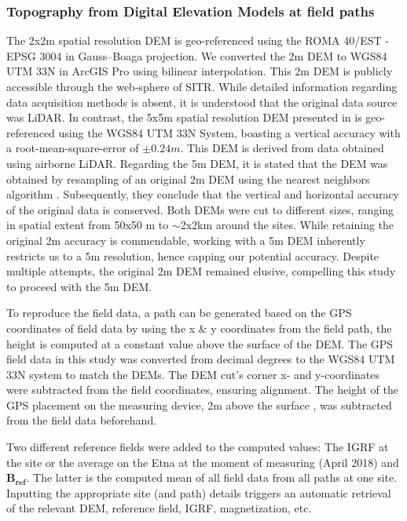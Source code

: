 \subsubsection{Topography from Digital Elevation Models at field paths}
The 2x2m spatial resolution DEM \cite{ATA} is geo-referenced using the ROMA 40/EST - EPSG 3004 in Gauss–Boaga projection. We converted the 2m DEM to WGS84 UTM 33N in ArcGIS Pro using bilinear interpolation. This 2m DEM is publicly accessible through the web-sphere of SITR. While detailed information regarding data acquisition methods is absent, it is understood that the original data source was LiDAR. In contrast, the 5x5m spatial resolution DEM presented in \cite{Bisson16} is geo-referenced using the WGS84 UTM 33N System, boasting a vertical accuracy with a root-mean-square-error of $\pm 0.24 m$. This DEM is derived from data obtained using airborne LiDAR. Regarding the 5m DEM, it is stated that the DEM was obtained by resampling of an original 2m DEM using the nearest neighbors algorithm \parencite{Bisson16}. Subsequently, they conclude that the vertical and horizontal accuracy of the original data is conserved. Both DEMs were cut to different sizes, ranging in spatial extent from 50x50 m to $\sim$2x2km around the sites. While retaining the original 2m accuracy is commendable, working with a 5m DEM inherently restricts us to a 5m resolution, hence capping our potential accuracy. Despite multiple attempts, the original 2m DEM remained elusive, compelling this study to proceed with the 5m DEM.\par 
\par
To reproduce the field data, a path can be generated based on the GPS coordinates of field data by using the x \& y coordinates from the field path, the height is computed at a constant value above the surface of the DEM. The GPS field data in this study was converted from decimal degrees to the WGS84 UTM 33N system to match the DEMs. The DEM cut's corner x- and y-coordinates were subtracted from the field coordinates, ensuring alignment. The height of the GPS placement on the measuring device, 2m above the surface \parencite{deGroot19}, was subtracted from the field data beforehand. 
\par
Two different reference fields were added to the computed values: The IGRF at the site or the average on the Etna at the moment of measuring (April 2018) and $\mathbf{B_{ref}}$. The latter is the computed mean of all field data from all paths at one site. Inputting the appropriate site (and path) details triggers an automatic retrieval of the relevant DEM, reference field, IGRF, magnetization, etc.

